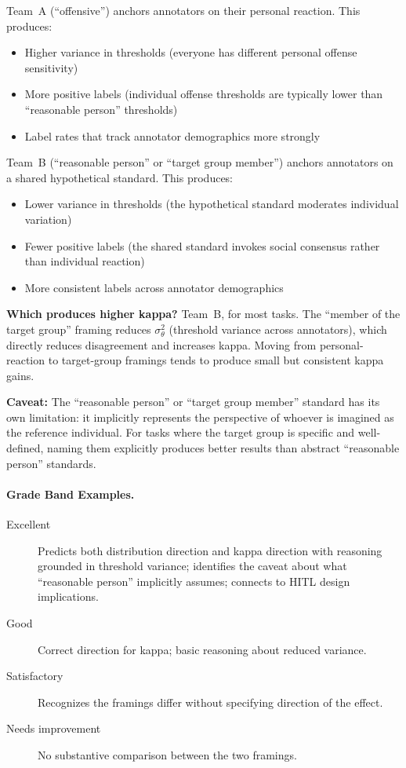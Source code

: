Team~A (``offensive'') anchors annotators on their personal reaction. This produces:
\begin{itemize}
    \item Higher variance in thresholds (everyone has different personal offense sensitivity)
    \item More positive labels (individual offense thresholds are typically lower than ``reasonable person'' thresholds)
    \item Label rates that track annotator demographics more strongly
\end{itemize}

Team~B (``reasonable person'' or ``target group member'') anchors annotators on a shared hypothetical standard. This produces:
\begin{itemize}
    \item Lower variance in thresholds (the hypothetical standard moderates individual variation)
    \item Fewer positive labels (the shared standard invokes social consensus rather than individual reaction)
    \item More consistent labels across annotator demographics
\end{itemize}

\textbf{Which produces higher kappa?} Team~B, for most tasks. The ``member of the target group'' framing reduces $\sigma^2_\theta$ (threshold variance across annotators), which directly reduces disagreement and increases kappa. Moving from personal-reaction to target-group framings tends to produce small but consistent kappa gains.

\textbf{Caveat:} The ``reasonable person'' or ``target group member'' standard has its own limitation: it implicitly represents the perspective of whoever is imagined as the reference individual. For tasks where the target group is specific and well-defined, naming them explicitly produces better results than abstract ``reasonable person'' standards.

\paragraph{Grade Band Examples.}

\begin{description}
    \item[Excellent] Predicts both distribution direction and kappa direction with reasoning grounded in threshold variance; identifies the caveat about what ``reasonable person'' implicitly assumes; connects to HITL design implications.

    \item[Good] Correct direction for kappa; basic reasoning about reduced variance.

    \item[Satisfactory] Recognizes the framings differ without specifying direction of the effect.

    \item[Needs improvement] No substantive comparison between the two framings.
\end{description}

